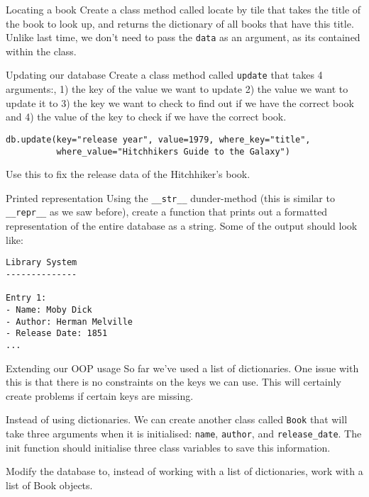 \documentclass[10pt]{beamer}
\begin{document}
\begin{frame}[label={sec:orgcd200bc},fragile]{Locating a book}
 Create a class method called locate by tile that takes the title of the book to look
up, and returns the dictionary of all books that have this title. Unlike last time,
we don't need to pass the \texttt{data} as an argument, as its contained within the class.
\end{frame}

\begin{frame}[label={sec:org7492a01},fragile]{Updating our database}
 Create a class method called \texttt{update} that takes 4 arguments:, 1) the key of the value
we want to update 2) the value we want to update it to 3) the key we want to check
to find out if we have the correct book and 4) the value of the key to check if we
have the correct book.

\begin{verbatim}
db.update(key="release year", value=1979, where_key="title",
          where_value="Hitchhikers Guide to the Galaxy")
\end{verbatim}

Use this to fix the release data of the Hitchhiker's book.
\end{frame}

\begin{frame}[label={sec:org265324c},fragile]{Printed representation}
 Using the \texttt{\_\_str\_\_} dunder-method (this is similar to \texttt{\_\_repr\_\_} as we saw before),
create a function that prints out a formatted representation of the entire database
as a string. Some of the output should look like:

\begin{verbatim}
Library System
--------------

Entry 1:
- Name: Moby Dick
- Author: Herman Melville
- Release Date: 1851
...
\end{verbatim}
\end{frame}

\begin{frame}[label={sec:org57c270e},fragile]{Extending our OOP usage}
 So far we've used a list of dictionaries. One issue with this is that there is no
constraints on the keys we can use. This will certainly create problems if certain
keys are missing.

Instead of using dictionaries. We can create another class called \texttt{Book} that will take
three arguments when it is initialised: \texttt{name}, \texttt{author}, and \texttt{release\_date}. The init
function should initialise three class variables to save this information.

Modify the database to, instead of working with a list of dictionaries, work with a
list of Book objects.
\end{frame}
\end{document}
